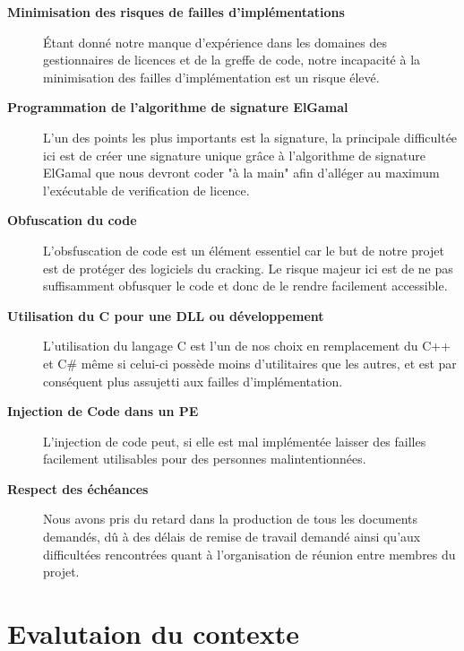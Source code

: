 \begin{description}
	\item[\textbf{Minimisation des risques de failles d'implémentations}]
	Étant donné notre manque d'expérience dans les domaines des gestionnaires de licences
	et de la greffe de code, notre incapacité à la minimisation des failles d'implémentation est un risque élevé.\newline
	
	\item[\textbf{Programmation de l'algorithme de signature ElGamal}]
	L'un des points les plus importants est la signature, la principale difficultée ici est de créer une signature unique grâce à 
	l'algorithme de signature ElGamal que nous devront coder "à la main" afin d'alléger au maximum l'exécutable de verification de licence.	\newline
	
	\item[\textbf{Obfuscation du code}]
	L'obsfuscation de code est un élément essentiel car le but de notre projet est de protéger des logiciels du cracking. 
	Le risque majeur ici est de ne pas suffisamment obfusquer le code et donc de le rendre facilement accessible.\newline
	
	\item[\textbf{Utilisation du C pour une DLL ou développement}]
	L'utilisation du langage C est l'un de nos choix en remplacement du C++ et C\# même si celui-ci possède moins d'utilitaires 
	que les autres, et est par conséquent plus assujetti aux failles d'implémentation.\newline
	
	\item[\textbf{Injection de Code dans un PE}]
	L'injection de code peut, si elle est mal implémentée laisser des failles facilement utilisables pour des personnes malintentionnées.\newline
	
	\item[\textbf{Respect des échéances}]
	Nous avons pris du retard dans la production de tous les documents demandés, dû à des délais de remise de travail demandé ainsi qu'aux 
	difficultées rencontrées quant à l'organisation de réunion entre membres du projet.\newline
\end{description}

\chapter{Evalutaion du contexte}

